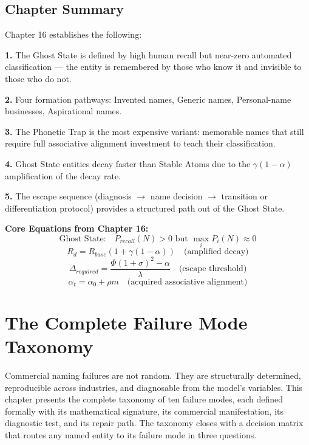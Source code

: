 \documentclass[12pt, openany]{book}
\theoremstyle{thmstyle}
\theoremstyle{defstyle}
\begin{document}
\section{Chapter Summary}

Chapter 16 establishes the following:

\textbf{1.} The Ghost State is defined by high human recall but near-zero automated classification --- the entity is remembered by those who know it and invisible to those who do not.

\textbf{2.} Four formation pathways: Invented names, Generic names, Personal-name businesses, Aspirational names.

\textbf{3.} The Phonetic Trap is the most expensive variant: memorable names that still require full associative alignment investment to teach their classification.

\textbf{4.} Ghost State entities decay faster than Stable Atoms due to the $\gamma(1-\alpha)$ amplification of the decay rate.

\textbf{5.} The escape sequence (diagnosis $\to$ name decision $\to$ transition or differentiation protocol) provides a structured path out of the Ghost State.

\begin{equationbox}
\textbf{Core Equations from Chapter 16:}
\[
\text{Ghost State:} \quad P_{recall}(N) > 0 \text{ but } \max_i P_i(N) \approx 0
\]
\[
R_d = R_{base}(1 + \gamma(1-\alpha)) \quad \text{(amplified decay)}
\]
\[
\Delta_{required} = \frac{\Phi(1+\sigma)^2 - \alpha}{\lambda} \quad \text{(escape threshold)}
\]
\[
\alpha_t = \alpha_0 + \rho m \quad \text{(acquired associative alignment)}
\]
\end{equationbox}

\chapter{The Complete Failure Mode Taxonomy}

\begin{keybox}
Commercial naming failures are not random. They are structurally determined, reproducible across industries, and diagnosable from the model's variables. This chapter presents the complete taxonomy of ten failure modes, each defined formally with its mathematical signature, its commercial manifestation, its diagnostic test, and its repair path. The taxonomy closes with a decision matrix that routes any named entity to its failure mode in three questions.
\end{keybox}
\end{document}
